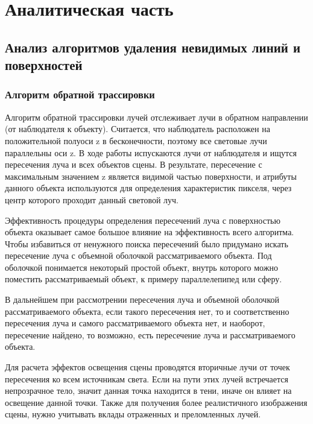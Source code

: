 \chapter{Аналитическая часть}

\section{Анализ алгоритмов удаления невидимых линий и поверхностей}

\subsection{Алгоритм обратной трассировки}

Алгоритм обратной трассировки лучей отслеживает лучи в обратном направлении (от наблюдателя к объекту). Считается, что наблюдатель расположен на положительной полуоси z в бесконечности, поэтому все световые лучи параллельны оси z. В ходе работы испускаются лучи от наблюдателя и ищутся пересечения луча и всех объектов сцены. В результате, пересечение с максимальным значением z является видимой частью поверхности, и атрибуты данного объекта используются для определения характеристик пикселя, через центр которого проходит данный световой луч. 


Эффективность процедуры определения пересечений луча с поверхностью объекта оказывает самое большое влияние на эффективность всего алгоритма. Чтобы избавиться от ненужного поиска пересечений было придумано искать пересечение луча с объемной оболочкой рассматриваемого объекта. Под оболочкой понимается некоторый простой объект, внутрь которого можно поместить рассматриваемый объект, к примеру параллелепипед или сферу. 

В дальнейшем при рассмотрении пересечения луча и объемной оболочкой рассматриваемого объекта, если такого пересечения нет, то и соответственно пересечения луча и самого рассматриваемого объекта нет, и наоборот, пересечение найдено, то возможно, есть пересечение луча и рассматриваемого объекта. 

Для расчета эффектов освещения сцены проводятся вторичные лучи от точек пересечения ко всем источникам света. Если на пути этих лучей встречается непрозрачное тело, значит данная точка находится в тени, иначе он влияет на освещение данной точки. Также для получения более реалистичного изображения сцены, нужно учитывать вклады отраженных и преломленных лучей.

